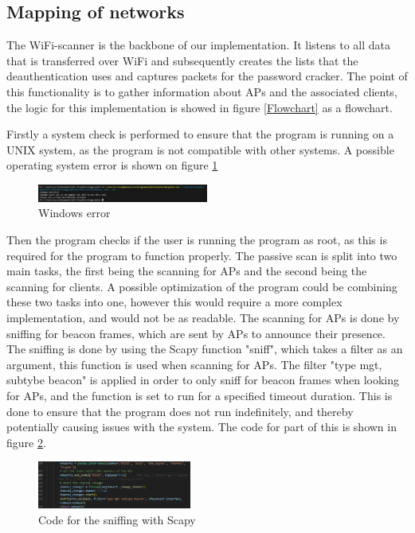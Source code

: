 \subsection{Mapping of networks}
The WiFi-scanner is the backbone of our implementation. It listens to all data that is transferred over WiFi and subsequently creates the lists that the deauthentication uses and captures packets for the password cracker. The point of this functionality is to gather information about APs and the associated clients, the logic for this implementation is showed in figure \ref{Flowchart} as a flowchart.

Firstly a system check is performed to ensure that the program is running on a UNIX system, as the program is not compatible with other systems. A possible operating system error is shown on figure \ref{W_error}

\begin{figure}[!htbp]
    \centering
    \includegraphics[width=0.5\textwidth]{Latex-Files/Billeder/Implementation/Windows_error.png}
    \caption{Windows error}
    \label{W_error}
\end{figure}

Then the program checks if the user is running the program as root, as this is required for the program to function properly. The passive scan is split into two main tasks, the first being the scanning for APs and the second being the scanning for clients. 
A possible optimization of the program could be combining these two tasks into one, however this would require a more complex implementation, and would not be as readable.
The scanning for APs is done by sniffing for beacon frames, which are sent by APs to announce their presence.
The sniffing is done by using the Scapy function "sniff", which takes a filter as an argument, this function is used when scanning for APs. The filter "type mgt, subtybe beacon" is applied in order to only sniff for beacon frames when looking for APs, and the function is set to run for a specified timeout duration. This is done to ensure that the program does not run indefinitely, and thereby potentially causing issues with the system. The code for part of this is shown in figure \ref{Scan1}.

\begin{figure}[!htbp]
    \centering
    \includegraphics[width=0.45\textwidth]{Latex-Files/Billeder/Implementation/AP_Scan.png}
    \caption{Code for the sniffing with Scapy}
    \label{Scan1}
\end{figure}


